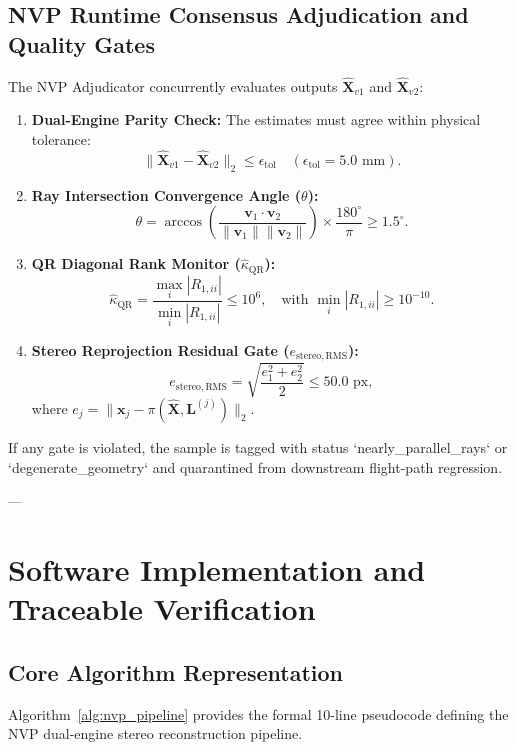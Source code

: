 \documentclass[journal]{IEEEtran}
\begin{document}
\subsection{NVP Runtime Consensus Adjudication and Quality Gates}
The NVP Adjudicator concurrently evaluates outputs $\hat{\mathbf{X}}_{v1}$ and $\hat{\mathbf{X}}_{v2}$:
\begin{enumerate}
    \item \textbf{Dual-Engine Parity Check:} The estimates must agree within physical tolerance:
    \begin{equation}
    \|\hat{\mathbf{X}}_{v1} - \hat{\mathbf{X}}_{v2}\|_2 \le \epsilon_{\mathrm{tol}} \quad (\epsilon_{\mathrm{tol}} = 5.0\text{ mm}).
    \end{equation}
    \item \textbf{Ray Intersection Convergence Angle ($\theta$):}
    \begin{equation}
    \theta = \arccos\left(\frac{\mathbf{v}_1 \cdot \mathbf{v}_2}{\|\mathbf{v}_1\| \|\mathbf{v}_2\|}\right) \times \frac{180^\circ}{\pi} \ge 1.5^\circ.
    \end{equation}
    \item \textbf{QR Diagonal Rank Monitor ($\widehat{\kappa}_{\mathrm{QR}}$):}
    \begin{equation}
    \widehat{\kappa}_{\mathrm{QR}} = \frac{\max_{i} |R_{1, ii}|}{\min_{i} |R_{1, ii}|} \le 10^6, \quad \text{with } \min_{i} |R_{1, ii}| \ge 10^{-10}.
    \end{equation}
    \item \textbf{Stereo Reprojection Residual Gate ($e_{\mathrm{stereo,RMS}}$):}
    \begin{equation}
    e_{\mathrm{stereo,RMS}} = \sqrt{\frac{e_1^2 + e_2^2}{2}} \le 50.0\text{ px},
    \end{equation}
    where $e_j = \|\mathbf{x}_j - \pi(\hat{\mathbf{X}}, \mathbf{L}^{(j)})\|_2$.
\end{enumerate}
If any gate is violated, the sample is tagged with status `nearly_parallel_rays` or `degenerate_geometry` and quarantined from downstream flight-path regression.

---

\section{Software Implementation and Traceable Verification}

\subsection{Core Algorithm Representation}
Algorithm~\ref{alg:nvp_pipeline} provides the formal 10-line pseudocode defining the NVP dual-engine stereo reconstruction pipeline.
\end{document}
